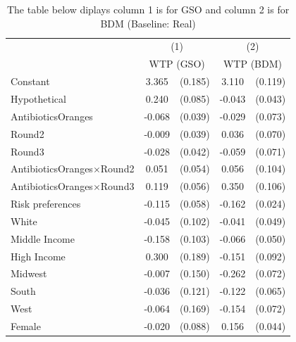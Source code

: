 \documentclass[12pt]{article}
\begin{document}
{            \begin{table}[htbp!]
                \centering
                \caption{The table below diplays column 1 is for GSO and column 2 is for BDM (Baseline: Real) }
                \label{tab:MSB_Appendix_interval_BDM_GSO}
      \begin{tabular}{l*{2}{cc}}
\hline\hline
            &\multicolumn{2}{c}{(1)}           &\multicolumn{2}{c}{(2)}           \\
            &\multicolumn{2}{c}{WTP (GSO)}      &\multicolumn{2}{c}{WTP (BDM)}    \\
\hline

Constant    &       3.365\sym{***}&     (0.185)&       3.110\sym{***}&     (0.119)\\
Hypothetical&       0.240\sym{***}&     (0.085)&      -0.043         &     (0.043)\\
AntibioticsOranges&      -0.068\sym{*}  &     (0.039)&      -0.029         &     (0.073)\\
Round2     &      -0.009         &     (0.039)&       0.036         &     (0.070)\\
Round3     &      -0.028         &     (0.042)&      -0.059         &     (0.071)\\
AntibioticsOranges$\times$Round2&       0.051         &     (0.054)&       0.056         &     (0.104)\\
AntibioticsOranges$\times$Round3&       0.119\sym{**} &     (0.056)&       0.350\sym{***}&     (0.106)\\
Risk preferences&      -0.115\sym{**} &     (0.058)&      -0.162\sym{***}&     (0.024)\\
White       &      -0.045         &     (0.102)&      -0.041         &     (0.049)\\
Middle Income&      -0.158         &     (0.103)&      -0.066         &     (0.050)\\
High Income &       0.300         &     (0.189)&      -0.151         &     (0.092)\\
Midwest     &      -0.007         &     (0.150)&      -0.262\sym{***}&     (0.072)\\
South       &      -0.036         &     (0.121)&      -0.122\sym{*}  &     (0.065)\\
West        &      -0.064         &     (0.169)&      -0.154\sym{**} &     (0.072)\\
Female      &      -0.020         &     (0.088)&       0.156\sym{***}&     (0.044)\\

\end{tabular}
\end{table}}
\end{document}
